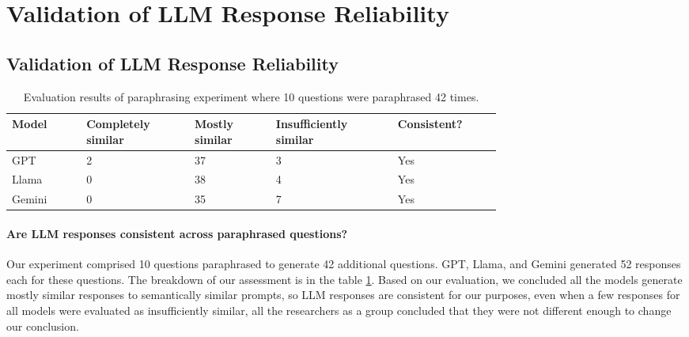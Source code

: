 


\if {}
    \section{Validation of LLM Response Reliability} \label{appendix-repro-validation}
\fi

\if {}
    \subsection{Validation of LLM Response Reliability} \label{appendix-repro-validation}
\fi


\begin{table}[!h]

\if {}
\fi

    \centering
    \setlength{\abovecaptionskip}{0pt}
    \caption{Evaluation results of paraphrasing experiment where 10 questions were paraphrased 42 times.}
    \label{tab:prompt-sensitivity-eval}
    \begin{tabular}{p{0.11\linewidth} p{0.16\linewidth} p{0.12\linewidth} p{0.18\linewidth} p{0.15\linewidth}}
        \toprule
        Model & Completely similar & Mostly similar & Insufficiently similar & Consistent? \\
        \midrule
        GPT & 2 & 37 & 3 & Yes\\
        Llama & 0 & 38 & 4  & Yes\\
        Gemini & 0  & 35  & 7  & Yes\\
        \bottomrule
    \end{tabular}
\end{table}

\paragraph{Are LLM responses consistent across paraphrased questions?} Our experiment comprised 10 questions paraphrased to generate 42 additional questions. GPT, Llama, and Gemini generated 52 responses each for these questions. The breakdown of our assessment is in the table \ref{tab:prompt-sensitivity-eval}. Based on our evaluation, we concluded all the models generate mostly similar responses to semantically similar prompts, so LLM responses are consistent for our purposes, even when a few responses for all models were evaluated as insufficiently similar, all the researchers as a group concluded that they were not different enough to change our conclusion. 

